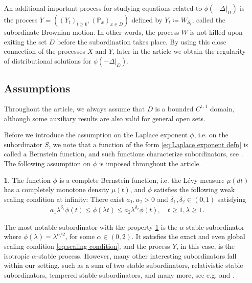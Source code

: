\documentclass[12pt,a4paper,onecolumn]{amsart}
\makeatletter
\theoremstyle{definition}
\newtheorem*{assumption*}{\assumptionnumber}
\providecommand{\assumptionnumber}{}
\newenvironment{assumption}[2]
{%
	\renewcommand{\assumptionnumber}{(\textbf{#1#2})}%
	\begin{assumption*}%
		\protected@edef\@currentlabel{(\textbf{#1#2})}%
	}
	{%
	\end{assumption*}
}
\newcommand{\p}{\mathbb{P}}
\newcommand{\1}{\mathbf 1}
\newcommand{\Lo}{\phi(-\left.\Delta\right\vert_{D})}
\numberwithin{equation}{section}
\makeatother
\begin{document}
An additional important process for studying equations related to $\Lo$ is the process $Y=((Y_t)_{t\ge0},(\p_x)_{x\in D})$ defined by $Y_t\coloneqq W_{S_t}$, called the subordinate Brownian motion. In other words, the process $W$ is not killed upon exiting the set $D$ before the subordination takes place. By using this close connection of the processes $X$ and 
 $Y$, later in the article we obtain the regularity of distributional solutions for $\Lo$.

\subsection{Assumptions}
Throughout the article, we always assume that $D$ is a bounded $C^{1,1}$ domain, although some auxiliary results are also valid for general open sets.

Before we introduce the assumption on the Laplace exponent $\phi$, i.e. on the subordinator $S$, we note that a function of the form \eqref{eq:Laplace exponent defn} is called a Bernstein function, and such functions characterize subordinators, see \cite[Chapter 5]{bernstein}.
The following assumption on $\phi$ is imposed throughout the article.
\begin{assumption}{WSC}{}\label{WSC}
	The function $\phi$ is a complete Bernstein function, i.e. the L\'evy measure $\mu(dt)$ has a completely monotone density $\mu(t)$, and  $\phi$ satisfies the following weak scaling condition at infinity: There exist $a_1,a_2>0$ and $\delta_1, \delta_2  \in(0,1)$ satisfying
	\begin{align}\label{eq:scaling condition}
		a_1\lambda^{\delta_1}\phi(t)\le \phi(\lambda t)\le a_2\lambda^{\delta_2}\phi(t),\quad t\ge1, \lambda\ge 1.
	\end{align}
\end{assumption}

The most notable subordinator with the property \ref{WSC} is the $\alpha$-stable subordinator where $\phi(\lambda)=\lambda^{\alpha/2}$, for some $\alpha\in(0,2)$. It satisfies the exact and even global scaling condition \eqref{eq:scaling condition}, and the process $Y$, in this case, is the isotropic $\alpha$-stable process. However, many other interesting subordinators fall within our setting, such as a sum of two stable subordinators, relativistic stable subordinators, tempered stable subordinators, and many more, see e.g. \cite[p. 409]{KSV_bhpinf} and \cite[p. 41]{vondra_heat}.
\end{document}
